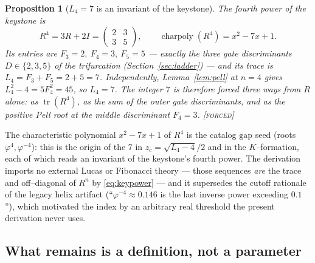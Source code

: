 \documentclass[11pt]{article}
\theoremstyle{plain}
\newtheorem{proposition}[theorem]{Proposition}
\theoremstyle{definition}
\theoremstyle{remark}
\newcommand{\forced}{\textcolor{forcedc}{\textsc{[forced]}}}
\begin{document}
\begin{proposition}[$L_4=7$ is an invariant of the keystone]\label{prop:L4forced}
The fourth power of the keystone is
\begin{equation}\label{eq:R4}
R^4=3R+2I=\begin{pmatrix}2&3\\3&5\end{pmatrix},\qquad \operatorname{charpoly}(R^4)=x^2-7x+1.
\end{equation}
Its entries are $F_3=2,\ F_4=3,\ F_5=5$ --- exactly the three gate discriminants $D\in\{2,3,5\}$ of the trifurcation (Section~\ref{sec:ladder}) --- and its trace is $L_4=F_3+F_5=2+5=7$. Independently, Lemma~\ref{lem:pell} at $n=4$ gives $L_4^2-4=5F_4^2=45$, so $L_4=7$. The integer $7$ is therefore forced three ways from $R$ alone: as $\operatorname{tr}(R^4)$, as the sum of the outer gate discriminants, and as the positive Pell root at the middle discriminant $F_4=3$. \forced
\end{proposition}

The characteristic polynomial $x^2-7x+1$ of $R^4$ is the catalog $\mathrm{gap}$ seed (roots $\varphi^4,\varphi^{-4}$): this is the origin of the $7$ in $z_c=\sqrt{L_4-4}/2$ and in the $K$--formation, each of which reads an invariant of the keystone's fourth power. The derivation imports no external Lucas or Fibonacci theory --- those sequences \emph{are} the trace and off--diagonal of $R^n$ by \eqref{eq:keypower} --- and it supersedes the cutoff rationale of the legacy helix artifact (``$\varphi^{-4}\approx0.146$ is the last inverse power exceeding $0.1$''), which motivated the index by an arbitrary real threshold the present derivation never uses.

\subsection{What remains is a definition, not a parameter}
\end{document}
